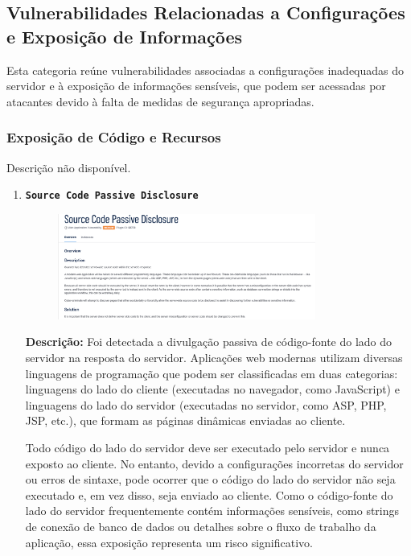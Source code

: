 \documentclass[a4paper,12pt]{article}
\begin{document}
\subsection{Vulnerabilidades Relacionadas a Configurações e Exposição de Informações}
Esta categoria reúne vulnerabilidades associadas a configurações inadequadas do servidor e à exposição de informações sensíveis, que podem ser acessadas por atacantes devido à falta de medidas de segurança apropriadas.

\subsubsection{Exposição de Código e Recursos}
Descrição não disponível.

\begin{enumerate}
\item \textbf{\texttt{Source Code Passive Disclosure}}

                        \begin{figure}[h!]
                        \centering
                        \includegraphics[width=0.8\textwidth]{assets/images-was/Vulnerabilidades Relacionadas a Configurações e Exposição de Informações/Exposição de Código e Recursos/Source Code Passive Disclosure.png}
                        \end{figure}
                        \FloatBarrier
                        \textbf{Descrição:} Foi detectada a divulgação passiva de código-fonte do lado do servidor na resposta do servidor. Aplicações web modernas utilizam diversas linguagens de programação que podem ser classificadas em duas categorias: linguagens do lado do cliente (executadas no navegador, como JavaScript) e linguagens do lado do servidor (executadas no servidor, como ASP, PHP, JSP, etc.), que formam as páginas dinâmicas enviadas ao cliente.

    Todo código do lado do servidor deve ser executado pelo servidor e nunca exposto ao cliente. No entanto, devido a configurações incorretas do servidor ou erros de sintaxe, pode ocorrer que o código do lado do servidor não seja executado e, em vez disso, seja enviado ao cliente. Como o código-fonte do lado do servidor frequentemente contém informações sensíveis, como strings de conexão de banco de dados ou detalhes sobre o fluxo de trabalho da aplicação, essa exposição representa um risco significativo.


\end{enumerate}
\end{document}
